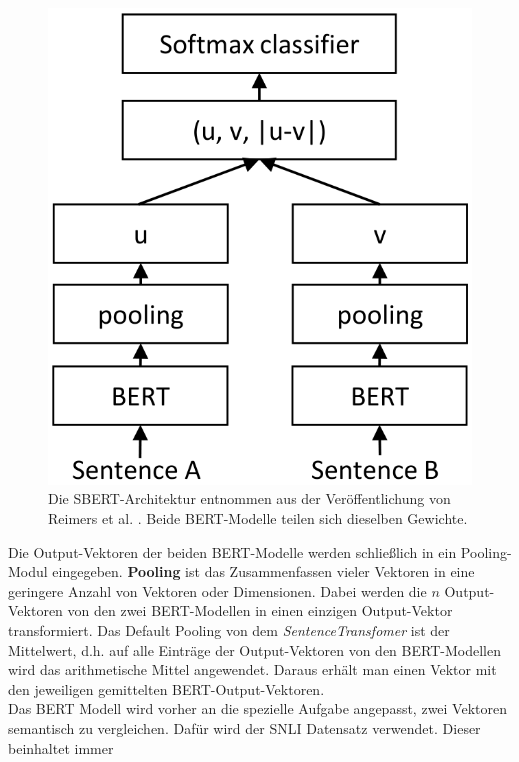 \documentclass[12pt,letterpaper,ngerman]{article}
\begin{document}
\begin{figure}
  \begin{center}
    \includegraphics[scale=0.3]{abb/SBERT.png}
  \end{center}
  \caption{
    Die SBERT-Architektur entnommen aus der Veröffentlichung
    von Reimers et al.
    \cite{reimers-2019-sentence-bert}. 
    Beide BERT-Modelle teilen sich dieselben Gewichte. 
  }
\end{figure}
Die Output-Vektoren der beiden BERT-Modelle werden schließlich 
in ein Pooling-Modul eingegeben. 
{\bf Pooling} ist das Zusammenfassen vieler Vektoren 
in eine geringere Anzahl von Vektoren oder Dimensionen.
Dabei werden die $n$ Output-Vektoren von den zwei BERT-Modellen in
einen einzigen Output-Vektor transformiert. Das Default Pooling
von dem \textit{SentenceTransfomer} ist der Mittelwert, d.h.
auf alle  Einträge der Output-Vektoren von den BERT-Modellen
wird das arithmetische Mittel angewendet.
Daraus erhält man einen Vektor mit den jeweiligen gemittelten 
BERT-Output-Vektoren.\\
Das BERT Modell wird  vorher an die spezielle Aufgabe 
angepasst, zwei Vektoren semantisch zu vergleichen. 
Dafür wird der SNLI Datensatz verwendet. Dieser beinhaltet immer 
\end{document}
